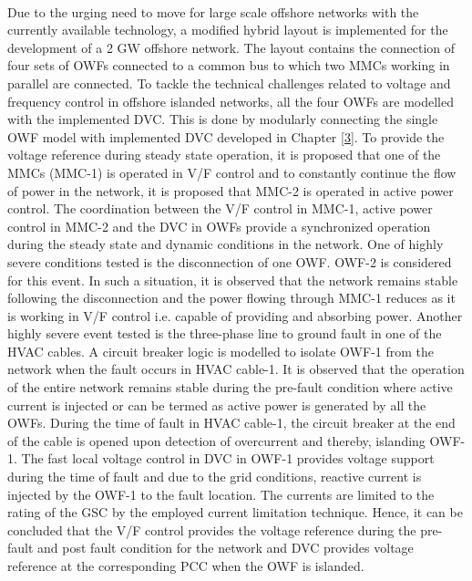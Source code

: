 \paragraph{} Due to the urging need to move for large scale offshore networks with the currently available technology, a modified hybrid layout is implemented for the development of a 2 GW offshore network. The layout contains the connection of four sets of \gls{OWF}s connected to a common bus to which two \gls{MMC}s working in parallel are connected. To tackle the technical challenges related to voltage and frequency control in offshore islanded networks, all the four \gls{OWF}s are modelled with the implemented \gls{DVC}. This is done by modularly connecting the single \gls{OWF} model with implemented \gls{DVC} developed in Chapter \ref{3}. To provide the voltage reference during steady state operation, it is proposed that one of the \gls{MMC}s (\gls{MMC}-1) is operated in V/F control and to constantly continue the flow of power in the network, it is proposed that \gls{MMC}-2 is operated in active power control. %
The coordination between the V/F control in \gls{MMC}-1, active power control in \gls{MMC}-2 and the \gls{DVC} in \gls{OWF}s provide a synchronized operation during the steady state and dynamic conditions in the network. One of highly severe conditions tested is the disconnection of one \gls{OWF}. \gls{OWF}-2 is considered for this event. In such a situation, it is observed that the network remains stable following the disconnection and the power flowing through \gls{MMC}-1 reduces as it is working in V/F control i.e. capable of providing and absorbing power. Another highly severe event tested is the three-phase line to ground fault in one of the \gls{HVAC} cables. A circuit breaker logic is modelled to isolate \gls{OWF}-1 from the network when the fault occurs in \gls{HVAC} cable-1. It is observed that the operation of the entire network remains stable during the pre-fault condition where active current is injected or can be termed as active power is generated by all the \gls{OWF}s. During the time of fault in \gls{HVAC} cable-1, the circuit breaker at the end of the cable is opened upon detection of overcurrent and thereby, islanding \gls{OWF}-1. The fast local voltage control in \gls{DVC} in \gls{OWF}-1 provides voltage support during the time of fault and due to the grid conditions, reactive current is injected by the \gls{OWF}-1 to the fault location. The currents are limited to the rating of the \gls{GSC} by the employed current limitation technique. Hence, it can be concluded that the V/F control provides the voltage reference during the pre-fault and post fault condition for the network and \gls{DVC} provides voltage reference at the corresponding \gls{PCC} when the \gls{OWF} is islanded.


